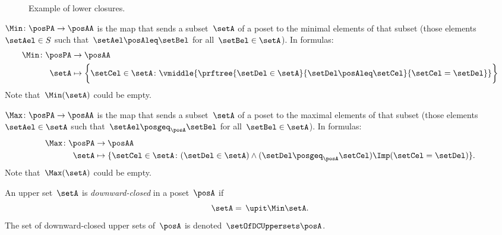 \begin{figure*}[h!]
    \centering
    \caption{Example of lower closures.}
    \label{fig:examplebatt}
\end{figure*}

\begin{definition}[Min]
    \label{def:Min}
    $\Min \colon \posPA \to \posAA$ is the map that sends a subset~$\setA$ of a poset to the minimal elements of that subset (those elements~$\setAel \in S$ such that~$\setAel \posAleq \setBel$ for all~$\setBel \in \setA$).
    In formulas:
    \begin{equation*}
        \begin{aligned}
            \Min \colon \posPA & \to \posAA      \\
            \setA              & \mapsto \bigg\{
            \setCel\in \setA\colon
            \vmiddle{\prftree{
                    \setDel\in \setA
                }{
                    \setDel\posAleq \setCel
                }{
                    \setCel=\setDel
                }}
            \bigg\}
        \end{aligned}
    \end{equation*}
    Note that~$\Min(\setA)$ could be empty.
\end{definition}

\begin{definition}[Max]
    \label{def:Max}
    $\Max \colon \posPA \to \posAA$ is the map that sends a subset~$\setA$ of a poset to the maximal elements of that subset (those elements~$\setAel \in \setA$ such that~$\setAel \posgeq_\posA \setBel$ for all~$\setBel \in \setA$).
    In formulas:
    \begin{equation*}
        \begin{aligned}
            \Max \colon \posPA & \to \posAA                                                                                                        \\
            \setA              & \mapsto \{ \setCel\in \setA\colon (\setDel\in \setA)\wedge(\setDel\posgeq_\posA \setCel)\Imp (\setCel=\setDel)\}.
        \end{aligned}
    \end{equation*}
    Note that~$\Max(\setA)$ could be empty.
\end{definition}

\begin{definition}
    \label{def:downward-closed-upperset}
    An upper set~$\setA$ is \emph{downward-closed} in a poset~$\posA$ if
    \begin{equation}
        \setA =\, \upit  \Min \setA.
    \end{equation}
    The set of downward-closed upper sets of~$\posA$ is denoted~$\setOfDCUppersets \posA$.

\end{definition}

